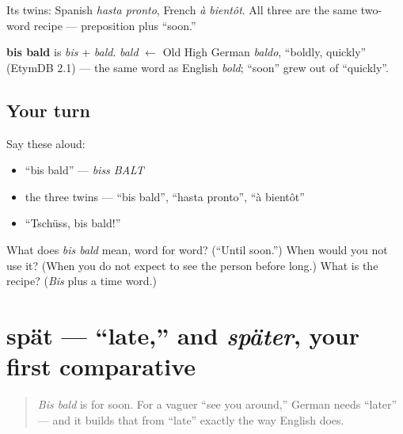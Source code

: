 Its twins: Spanish \emph{hasta pronto}, French \emph{à bientôt}. All three are the same two-word recipe — preposition plus \textquotedblleft{}soon.\textquotedblright{}

\begin{cousinweb}
\textbf{bis bald} is \emph{bis} + \emph{bald}. \emph{bald} $\leftarrow$ Old High German \emph{baldo}, \textquotedblleft{}boldly, quickly\textquotedblright{} (EtymDB 2.1) — the same word as English \emph{bold}; \textquotedblleft{}soon\textquotedblright{} grew out of \textquotedblleft{}quickly\textquotedblright{}.
\end{cousinweb}

\subsection*{Your turn}
Say these aloud:

\begin{itemize}
\raggedright
  \item \textquotedblleft{}bis bald\textquotedblright{} — \emph{biss BALT}
  \item the three twins — \textquotedblleft{}bis bald\textquotedblright{}, \textquotedblleft{}hasta pronto\textquotedblright{}, \textquotedblleft{}à bientôt\textquotedblright{}
  \item \textquotedblleft{}Tschüss, bis bald!\textquotedblright{}
\end{itemize}

\begin{tcolorbox}[breakable,colback=teal!4,colframe=teal!35!black,title={Before you move on}]
What does \emph{bis bald} mean, word for word? (\textquotedblleft{}Until soon.\textquotedblright{}) When would you not use it? (When you do not expect to see the person before long.) What is the recipe? (\emph{Bis} plus a time word.)
\end{tcolorbox}
\section[spät]{spät — \textquotedblleft{}late,\textquotedblright{} and \emph{später}, your first comparative}

\label{lesson:GE-C04-spaet}



\begin{quote}
\emph{Bis bald} is for soon. For a vaguer \textquotedblleft{}see you around,\textquotedblright{} German needs \textquotedblleft{}later\textquotedblright{} — and it builds that from \textquotedblleft{}late\textquotedblright{} exactly the way English does.
\end{quote}

